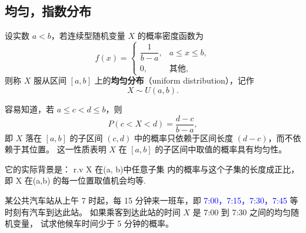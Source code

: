 \subsection{均匀，指数分布}
\begin{proposition}[区间上的均匀分布]
设实数 $a<b$，若连续型随机变量 $X$ 的概率密度函数为
\[
f(x)=
\begin{cases}
\dfrac{1}{b-a}, & a \leq x \leq b, \\[6pt]
0, & \text{其他},
\end{cases} \tag{2.1.10}
\]
则称 $X$ 服从区间 $[a,b]$ 上的\textbf{均匀分布}（uniform distribution），记作
\[
X \sim U(a,b).
\]

容易知道，若 $a \leq c < d \leq b$，则
\[
P(c<X<d)=\frac{d-c}{b-a},
\]
即 $X$ 落在 $[a,b]$ 的子区间 $(c,d)$ 中的概率只依赖于区间长度 $(d-c)$，而不依赖于其位置。  
这一性质表明 $X$ 在 $[a,b]$ 的子区间中取值的概率具有均匀性。
\end{proposition}
\begin{dxtips}
    它的实际背景是： r.v X  在(a, b)中任意子集
内的概率与这个子集的长度成正比，即 X 在(a,b)
的每一位置取值机会均等.

\end{dxtips}
\begin{example}
某公共汽车站从上午 7 时起，每 15 分钟来一班车，即 
\textcolor{blue}{7:00，7:15，7:30，7:45} 等时刻有汽车到达此站。
如果乘客到达此站的时间 $X$ 是 7:00 到 7:30 之间的均匀随机变量，
试求他候车时间少于 5 分钟的概率。
\end{example}

